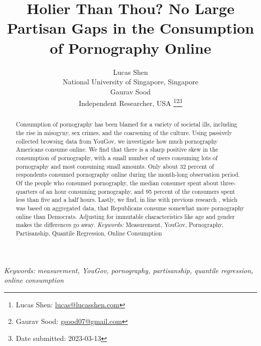 \documentclass[12pt,twoside]{article}
\date{}
\title{\normalsize \headingfont \textbf{Holier Than Thou? No Large Partisan Gaps in the Consumption of Pornography Online} \vspace{-1.5em}}
\author{\normalsize Lucas Shen\\ \normalsize National University of Singapore, Singapore
\vspace{1em} \\ \normalsize Gaurav Sood \\ \normalsize Independent Researcher, USA \thanks{Lucas Shen: \href{mailto:lucas@lucasshen.com}{lucas@lucasshen.com}}\thanks{Gaurav Sood: \href{mailto:gsood07@gmail.com}{gsood07@gmail.com}}\thanks{Date submitted: 2023-03-13}}
\providecommand{\keywords}[1]
{
   \small	
  \textit{\hspace{-1em} Keywords: } #1
}
\begin{document}
\maketitle
\thispagestyle{firstpage}
\vspace{-8em}

\begin{abstract}
  Consumption of pornography has been blamed for a variety of societal ills, including the rise in misogyny, sex crimes, and the coarsening of the culture. Using passively collected browsing data from YouGov, we investigate how much pornography Americans consume online. We find that there is a sharp positive skew in the consumption of pornography, with a small number of users consuming lots of pornography and most consuming small amounts. Only about 32 percent of respondents consumed pornography online during the month-long observation period. Of the people who consumed pornography, the median consumer spent about three-quarters of an hour consuming pornography, and 95 percent of the consumers spent less than five and a half hours. Lastly, we find, in line with previous research \citep{macinnis2015american, edelman2009markets}, which was based on aggregated data, that Republicans consume somewhat more pornography online than Democrats. Adjusting for immutable characteristics like age and gender makes the differences go away.
\emph{Keywords:} Measurement, YouGov, Pornography, Partisanship, Quantile Regression, Online Consumption
\end{abstract}

\keywords{\textit{measurement, YouGov, pornography, partisanship, quantile regression, online consumption} \vspace{8ex}}
\end{document}
